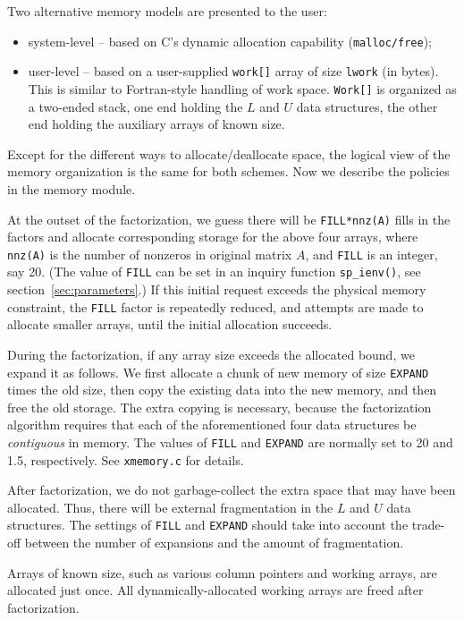 Two alternative memory models are presented to the user:
\begin{itemize}
\item system-level -- based on C's dynamic allocation capability 
      ({\tt malloc/free});
\item user-level -- based on a user-supplied {\tt work[]} array of 
      size {\tt lwork} (in bytes). This is similar to Fortran-style
      handling of work space. {\tt Work[]} is organized as a two-ended stack, 
      one end holding the $L$ and $U$ data structures, the other end 
      holding the auxiliary arrays of known size.
\end{itemize}

Except for the different ways to allocate/deallocate space, the logical 
view of the memory organization is the same for both schemes. 
Now we describe the policies in the memory module.

At the outset of the factorization, we guess there will be {\tt FILL*nnz(A)}
fills in the factors and allocate corresponding storage for the 
above four arrays, where 
{\tt nnz(A)} is the number of nonzeros in original matrix $A$, and 
{\tt FILL} is an integer, say 20. (The value of {\tt FILL} can be
set in an inquiry function {\tt sp\_ienv()}, see section~\ref{sec:parameters}.)
If this initial request exceeds the physical memory constraint, 
the {\tt FILL} factor is repeatedly reduced, and attempts are made to 
allocate smaller arrays, until the initial allocation succeeds.

During the factorization, 
if any array size exceeds the allocated bound, we expand it
as follows. We first allocate a chunk of new memory of size {\tt EXPAND}
times the old size, then copy the existing data into the new 
memory, and then free the old storage. The extra copying is necessary,
because the factorization algorithm requires that
each of the aforementioned four data structures be {\em contiguous} in memory.
The values of {\tt FILL} and {\tt EXPAND} are normally set to 20 and 1.5, 
respectively. See {\tt xmemory.c} for details.

After factorization, we do not garbage-collect the extra space that
may have been allocated. Thus, there will be external fragmentation in
the $L$ and $U$ data structures. The settings of {\tt FILL} and {\tt EXPAND} 
should take into account the trade-off between the number of expansions 
and the amount of fragmentation.

Arrays of known size, such as various column pointers and working arrays, 
are allocated just once. All dynamically-allocated working arrays are freed
after factorization.


